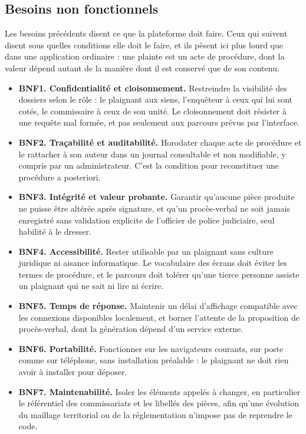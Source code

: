 \subsection{Besoins non fonctionnels}

Les besoins précédents disent ce que la plateforme doit faire. Ceux qui suivent disent sous quelles conditions elle doit le faire, et ils pèsent ici plus lourd que dans une application ordinaire : une plainte est un acte de procédure, dont la valeur dépend autant de la manière dont il est conservé que de son contenu.

\begin{itemize}
    \item \textbf{BNF1. Confidentialité et cloisonnement.} Restreindre la visibilité des dossiers selon le rôle : le plaignant aux siens, l'enquêteur à ceux qui lui sont cotés, le commissaire à ceux de son unité. Le cloisonnement doit résister à une requête mal formée, et pas seulement aux parcours prévus par l'interface.
    \item \textbf{BNF2. Traçabilité et auditabilité.} Horodater chaque acte de procédure et le rattacher à son auteur dans un journal consultable et non modifiable, y compris par un administrateur. C'est la condition pour reconstituer une procédure a posteriori.
    \item \textbf{BNF3. Intégrité et valeur probante.} Garantir qu'aucune pièce produite ne puisse être altérée après signature, et qu'un procès-verbal ne soit jamais enregistré sans validation explicite de l'officier de police judiciaire, seul habilité à le dresser.
    \item \textbf{BNF4. Accessibilité.} Rester utilisable par un plaignant sans culture juridique ni aisance informatique. Le vocabulaire des écrans doit éviter les termes de procédure, et le parcours doit tolérer qu'une tierce personne assiste un plaignant qui ne sait ni lire ni écrire.
    \item \textbf{BNF5. Temps de réponse.} Maintenir un délai d'affichage compatible avec les connexions disponibles localement, et borner l'attente de la proposition de procès-verbal, dont la génération dépend d'un service externe.
    \item \textbf{BNF6. Portabilité.} Fonctionner sur les navigateurs courants, sur poste comme sur téléphone, sans installation préalable : le plaignant ne doit rien avoir à installer pour déposer.
    \item \textbf{BNF7. Maintenabilité.} Isoler les éléments appelés à changer, en particulier le référentiel des commissariats et les libellés des pièces, afin qu'une évolution du maillage territorial ou de la réglementation n'impose pas de reprendre le code.
\end{itemize}

